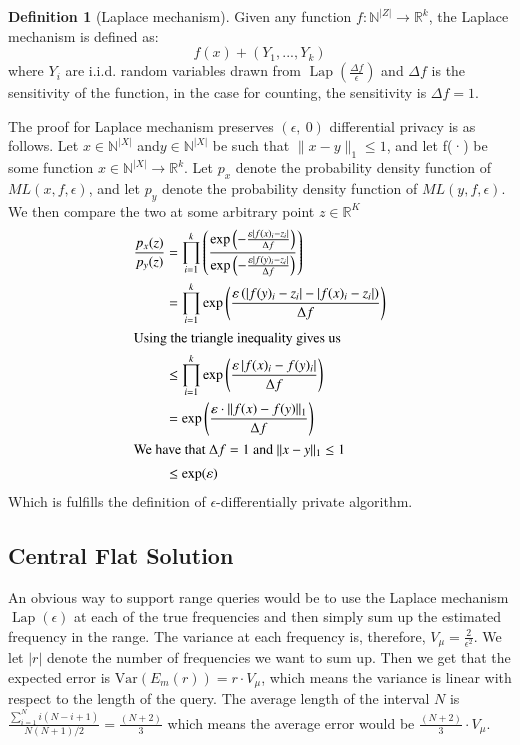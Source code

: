 \documentclass[11pt]{article}
\theoremstyle{definition}
\newtheorem{definition}{Definition}[section]
\begin{document}
\begin{definition}[Laplace mechanism]\label{lap}
Given any function $f:\mathbb{N}^{|Z|}\rightarrow \mathbb{R}^k$, the Laplace mechanism is defined as: \[f(x) + (Y_1,...,Y_k)\]
where $Y_i$ are i.i.d. random variables drawn from $\operatorname{Lap}(\frac{\Delta f}{\epsilon})$ and $\Delta f$ is the sensitivity of the function, in the case for counting, the sensitivity is $\Delta f=1$.
\end{definition}
The proof for Laplace mechanism preserves $(\epsilon, \ 0)$ differential privacy is as follows.
Let $x\in\mathbb{N}^{|X|}$ and$y\in\mathbb{N}^{|X|}$ be such that  $\lVert x-y\rVert_1\leq 1$, and let f(·) be some function $x\in\mathbb{N}^{|X|}\rightarrow \mathbb{R}^{k}$. Let $p_x$ denote the probability density function of $ML(x,f,\epsilon)$, and let $p_y$ denote the probability density function of $ML(y,f,\epsilon)$. We then compare the two at some arbitrary point $z\in\mathbb{R}^{K}$
\begin{align*}
\frac{p_{x}(z)}{p_{y}(z)} &=\prod_{i=1}^{k}\left(\frac{\exp \left(-\frac{\varepsilon\left|f(x)_{i}-z_{i}\right|}{\Delta f}\right)}{\exp \left(-\frac{\varepsilon\left|f(y)_{i}-z_{i}\right|}{\Delta f}\right)}\right) \\
&=\prod_{i=1}^{k} \exp \left(\frac{\varepsilon\left(\left|f(y)_{i}-z_{i}\right|-\left|f(x)_{i}-z_{i}\right|\right)}{\Delta f}\right) \\
\intertext{Using the triangle inequality gives us }
& \leq \prod_{i=1}^{k} \exp \left(\frac{\varepsilon\left|f(x)_{i}-f(y)_{i}\right|}{\Delta f}\right) \\
&=\exp \left(\frac{\varepsilon \cdot\|f(x)-f(y)\|_{1}}{\Delta f}\right) \\
\intertext{We have that $\Delta f = 1$ and $\lVert x-y\rVert_1\leq 1$  }
& \leq \exp (\varepsilon) 
\end{align*}
Which is fulfills the definition of $\epsilon$-differentially private algorithm.



\subsection{Central Flat Solution}\label{teo_cen_flat}
An obvious way to support range queries would be to use the Laplace mechanism $\operatorname{Lap}(\epsilon)$ at each of the true frequencies and then simply sum up the estimated frequency in the range. The variance at each frequency is, therefore, $V_\mu=\frac{2}{\epsilon^2}$. We let $|r|$ denote the number of frequencies we want to sum up. Then we get that the expected error is $\mathrm{Var}(E_m (r))=r\cdot V_\mu$, which means the variance is linear with respect to the length of the query. The average length of the interval $N$ is $\frac{\sum_{i=1}^{N} i(N-i+1)}{N(N+1) / 2}=\frac{(N+2)}{3}$ which means the average error would be $\frac{(N+2)}{3}\cdot V_\mu$.
\end{document}
